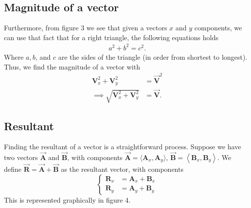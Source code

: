 \documentclass{report}
\begin{document}
    \subsection{Magnitude of a vector}
    \bigbreak \noindent 
    Furthermore, from figure 3 we see that given a vectors $x$ and $y$ components, we can use that fact that for a right triangle, the following equations holds 
    \begin{align*}
        a^{2} + b^{2} = c^{2}
    .\end{align*}
    Where $a,b$, and $c$ are the sides of the triangle (in order from shortest to longest). Thus, we find the magnitude of a vector with
    \begin{align*}
        \mathbf{V}_{x}^{2} + \mathbf{V}_{y}^{2} &= \vec{\mathbf{V}}^{2} \\
        \implies \sqrt{\mathbf{V}_{x}^{2} + \mathbf{V}_{y}^{2}} &= \vec{\mathbf{V}} 
    .\end{align*}
    \bigbreak \noindent 
    \subsection{Resultant}
    \bigbreak \noindent 
Finding the resultant of a vector is a straightforward process. Suppose we have two vectors $\vec{\mathbf{A}}$ and $\vec{\mathbf{B}}$, with components $\vec{\mathbf{A}} = \langle \mathbf{A}_{x}, \mathbf{A}_{y}\rangle$, $\vec{\mathbf{B}} = \left\langle \mathbf{B}_{x}, \mathbf{B}_{y} \right\rangle $. We define $\vec{\mathbf{R}} = \vec{\mathbf{A}} + \vec{\mathbf{B}}$ as the resultant vector, with components
    \bigbreak \noindent 
       \begin{equation}
            \begin{cases}
                \mathbf{R}_{x} &=  \mathbf{A}_{x} + \mathbf{B}_{x}\\
                \mathbf{R}_{y} &=  \mathbf{A}_{y} + \mathbf{B}_{y}
            \end{cases}
        \end{equation}
        \bigbreak \noindent 
        This is represented graphically in figure 4.
        \pagebreak \bigbreak \noindent 
    \begin{figure}[ht]
        \centering
        \label{fig:figure4}
    \end{figure}
    \bigbreak \noindent 
    \bigbreak \noindent 
\end{document}
